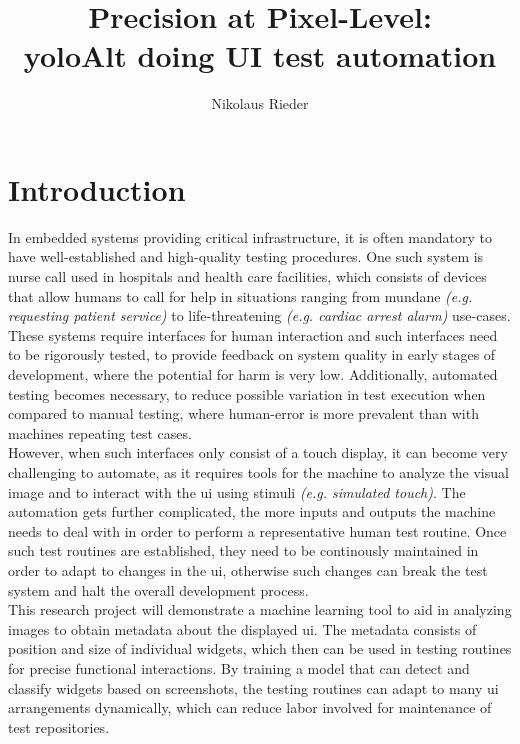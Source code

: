 \documentclass[Bachelor, BIC, english, fhCitStyle, IEEE]{BASE/twbook} %
\title{Precision at Pixel-Level:\\\acl{yoloAlt} doing UI test automation}
\author{Nikolaus Rieder}
\begin{document}
\maketitle
\chapter{Introduction}
In embedded systems providing critical infrastructure, it is often mandatory to have well-established and high-quality testing procedures. One such system is nurse call used in hospitals and health care facilities, which consists of devices that allow humans to call for help in situations ranging from mundane \textit{(e.g. requesting patient service)} to life-threatening \textit{(e.g. cardiac arrest alarm)} use-cases. These systems require interfaces for human interaction and such interfaces need to be rigorously tested, to provide feedback on system quality in early stages of development, where the potential for harm is very low. Additionally, automated testing becomes necessary, to reduce possible variation in test execution when compared to manual testing, where human-error is more prevalent than with machines repeating test cases.\\
However, when such interfaces only consist of a touch display, it can become very challenging to automate, as it requires tools for the machine to analyze the visual image and to interact with the \ac{ui} using stimuli \textit{(e.g. simulated touch)}. The automation gets further complicated, the more inputs and outputs the machine needs to deal with in order to perform a representative human test routine. Once such test routines are established, they need to be continously maintained in order to adapt to changes in the \ac{ui}, otherwise such changes can break the test system and halt the overall development process.\\
This research project will demonstrate a machine learning tool to aid in analyzing images to obtain metadata about the displayed \ac{ui}. The metadata consists of position and size of individual widgets, which then can be used in testing routines for precise functional interactions. By training a model that can detect and classify widgets based on screenshots, the testing routines can adapt to many \ac{ui} arrangements dynamically, which can reduce labor involved for maintenance of test repositories.\\
\end{document}
